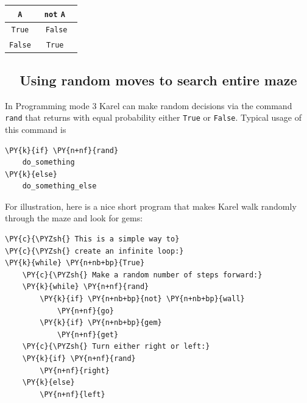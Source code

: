 \begin{center}
\begin{tabular}{|c||c|}
\hline
{\tt A} & \ {\tt not} {\tt A} \ \\
\hline
\hline
{\tt True} & {\tt False} \\
\hline
{\tt False} & \ {\tt True} \ \\
\hline
\end{tabular}
\end{center}
\vspace{4mm}
\noindent

\subsection{\ \ Using random moves to search entire maze}

In Programming mode 3 Karel can make random decisions via the command {\tt rand}
that returns with equal probability either {\tt True} or {\tt False}. 
Typical usage of this command is \\

\begin{bbox}
\begin{Verbatim}[commandchars=\\\{\}]
\PY{k}{if} \PY{n+nf}{rand}
    do_something
\PY{k}{else}
    do_something_else
\end{Verbatim}
\end{bbox}
\vspace{6mm}

\noindent
For illustration, here is a nice short program that makes Karel walk randomly 
through the maze and look for gems:\\

\begin{bbox}
\begin{Verbatim}[commandchars=\\\{\}]
\PY{c}{\PYZsh{} This is a simple way to}
\PY{c}{\PYZsh{} create an infinite loop:}
\PY{k}{while} \PY{n+nb+bp}{True}
    \PY{c}{\PYZsh{} Make a random number of steps forward:}
    \PY{k}{while} \PY{n+nf}{rand}
        \PY{k}{if} \PY{n+nb+bp}{not} \PY{n+nb+bp}{wall} 
            \PY{n+nf}{go}
        \PY{k}{if} \PY{n+nb+bp}{gem} 
            \PY{n+nf}{get}
    \PY{c}{\PYZsh{} Turn either right or left:}
    \PY{k}{if} \PY{n+nf}{rand}
        \PY{n+nf}{right}
    \PY{k}{else}
        \PY{n+nf}{left}
\end{Verbatim}
\end{bbox}
\vspace{6mm}

